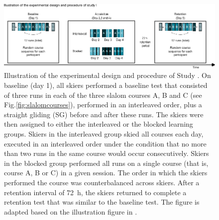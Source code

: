 \begin{figure}
    \centering
    \includegraphics[width=1\linewidth]{figure/figure_methods_CIdesign.pdf}
    \caption{Illustration of the experimental design and procedure of Study . On baseline (day 1), all skiers performed a baseline test that consisted of three runs in each of the three slalom courses A, B and C  (see Fig.\ref{fig:slalomcourses}), performed in an interleaved order, plus a straight gliding (SG) before and after these runs. The skiers were then assigned to either the interleaved or the blocked learning groups. Skiers in the interleaved group skied all courses each day, executed in an interleaved order under the condition that no more than two runs in the same course would occur consecutively. Skiers in the blocked group performed all runs on a single course (that is, course A, B or C) in a given session. The order in which the skiers performed the course was counterbalanced across skiers. After a retention interval of 72 h, the skiers returned to complete a retention test that was similar to the baseline test. The figure is adapted based on the illustration figure in \cite{magelssen_is_2022}.}
    \label{fig: ci_illustration}
\end{figure}


